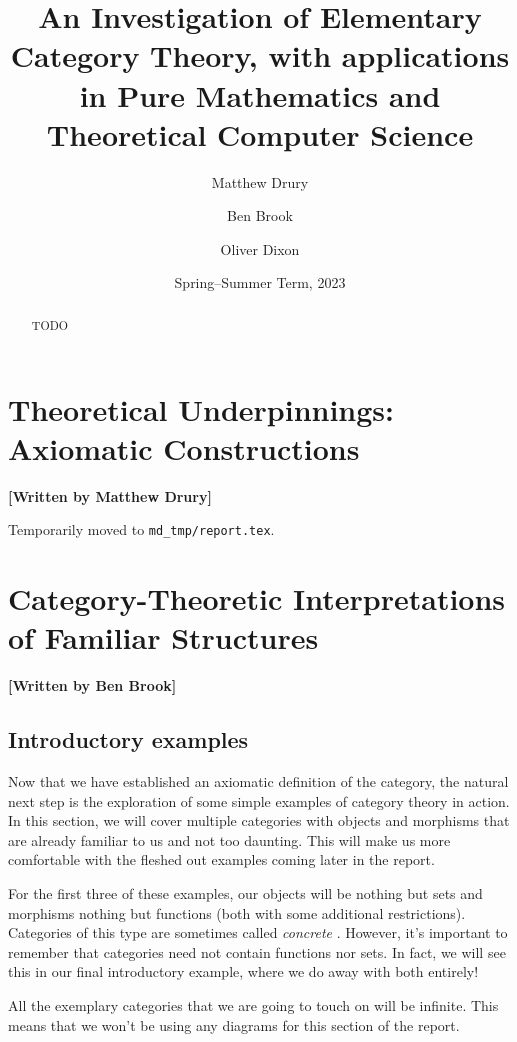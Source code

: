 \documentclass[10pt,a4paper,reqno]{amsart}
\title[An Investigation of Elementary Category Theory]{An Investigation of %
        Elementary Category Theory, with applications in Pure Mathematics and %
        Theoretical Computer Science}
\author{Matthew Drury} \email{\yorkemail{md1499}}
\author{Ben Brook}     \email{\yorkemail{bb1170}}
\author{Oliver Dixon}  \email{\yorkemail{od641}}
\date{Spring--Summer Term, 2023}
\numberwithin{figure}{section}
\begin{document}
\begin{abstract}
        TODO
\end{abstract}
\maketitle
\tableofcontents
\section{Theoretical %
        Underpinnings: Axiomatic Constructions}
\begin{flushright}
        \textbf{[Written by Matthew Drury]}
\end{flushright}

\noindent Temporarily moved to \texttt{md\_tmp/report.tex}.

\section{Category-Theoretic %
        Interpretations of Familiar Structures}
\begin{flushright}
        \textbf{[Written by Ben Brook]} 
\end{flushright}

\subsection{Introductory examples}
Now that we have established an axiomatic definition of the category, the
natural next step is the exploration of some simple examples of category theory
in action. In this section, we will cover multiple categories with objects and
morphisms that are already familiar to us and not too daunting. This will make
us more comfortable with the fleshed out examples coming later in the report.

For the first three of these examples, our objects will be
nothing but sets and morphisms nothing but functions (both with some additional
restrictions). Categories of this type are sometimes called
\emph{concrete} \autocite{Awodey:2010}.
However, it's important to remember that categories need not
contain functions nor sets. In fact, we will see this in our final introductory
example, where we do away with both entirely!

All the exemplary categories that we are going to touch on will be infinite.
This means that we won't be using any diagrams for this section of the report.
\end{document}
